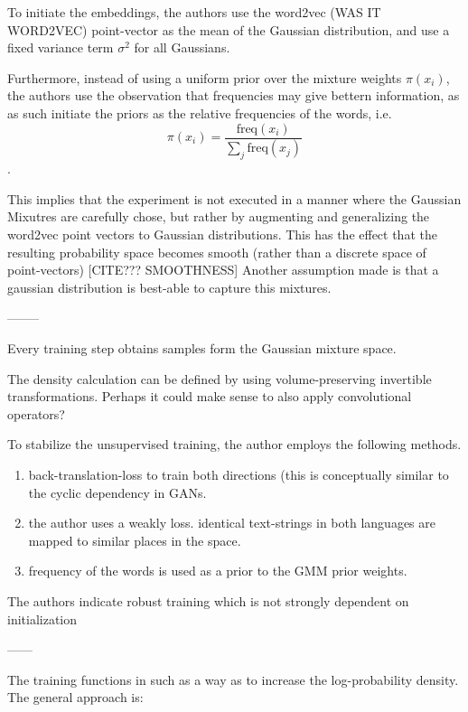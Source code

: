 \documentclass[a4paper,12pt,twoside,openright]{report}
\begin{document}
To initiate the embeddings, the authors use the word2vec (WAS IT WORD2VEC) point-vector as the mean of the Gaussian distribution, and use a fixed variance term $\sigma^2$ for all Gaussians.

Furthermore, instead of using a uniform prior over the mixture weights $\pi(x_i)$, the authors use the observation that frequencies may give bettern information, as as such initiate the priors as the relative frequencies of the words, i.e. $$ \pi(x_i) = \frac{ \text{freq} (x_i) }{\sum_j \text{freq} (x_j) } $$ .

This implies that the experiment is not executed in a manner where the Gaussian Mixutres are carefully chose, but rather by augmenting and generalizing the word2vec point vectors to Gaussian distributions.
This has the effect that the resulting probability space becomes smooth (rather than a discrete space of point-vectors) [CITE??? SMOOTHNESS]
Another assumption made is that a gaussian distribution is best-able to capture this mixtures.

--------

Every training step obtains samples form the Gaussian mixture space.

The density calculation can be defined by using volume-preserving invertible transformations. 
Perhaps it could make sense to also apply convolutional operators?

To stabilize the unsupervised training, the author employs the following methods.

\begin{enumerate}
\item back-translation-loss to train both directions (this is conceptually similar to the cyclic dependency in GANs.
\item  the author uses a weakly loss. identical text-strings in both languages are mapped to similar places in the space. 
\item frequency of the words is used as a prior to the GMM prior weights.
\end{enumerate}

The authors indicate robust training which is not strongly dependent on initialization


------

The training functions in such as a way as to increase the log-probability density.
The general approach is:
\end{document}

